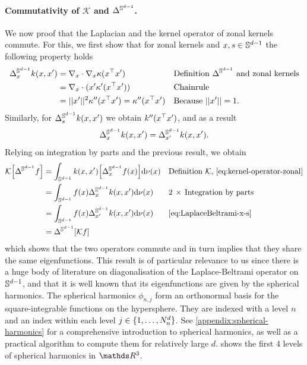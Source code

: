 \paragraph{Commutativity of $\mathcal{K}$ and $\Delta^{\mathbb{S}^{d-1}}$.}
We now proof that the Laplacian and the kernel operator of zonal kernels commute. For this, we first show that for zonal kernels and $x,s \in \mathbb{S}^{d-1}$ the following property holds
\begin{align}
    \Delta^{\mathbb{S}^{d-1}}_x k(x, x') 
     &= \nabla_x \cdot \nabla_x \kappa(x^{\top} x') && \text{Definition $\Delta^{\mathbb{S}^{d-1}}$ and zonal kernels}\\
     &= \nabla_x \cdot (x' \kappa'(x^{\top} x'))  && \text{Chainrule} \\
     &= \lvert\lvert x'\rvert\rvert^2 \kappa''(x^{\top} x') = \kappa''(x ^{\top} x') && \text{Because } \lvert\lvert x'\rvert\rvert = 1.
\end{align}
Similarly, for $\Delta^{\mathbb{S}^{d-1}}_s k(x, x')$ we obtain $k''(x ^{\top} x')$, and as a result
\begin{equation}
    \label{eq:LaplaceBeltrami-x-s}
\Delta^{\mathbb{S}^{d-1}}_x k(x, x') = \Delta^{\mathbb{S}^{d-1}}_{x'} k(x, x').
\end{equation}
Relying on integration by parts and the previous result, we obtain
\begin{align}
    \mathcal{K} \left[\LaplaceBeltrami f\right] &= \int_{\dsphere} k(x, x') \left[\LaplaceBeltrami_x f(x)\right] \calcd{\nu(x)} && \text{Definition $\mathcal{K}$, \cref{eq:kernel-operator-zonal}}\\
    &= \int_{\dsphere} f(x) \LaplaceBeltrami_x k(x, x')  \calcd{\nu(x)} && 2\,\times\,\text{Integration by parts}\\
    &= \int_{\dsphere} f(x) \LaplaceBeltrami_{x'} k(x, x')  \calcd{\nu(x)}  && \text{\cref{eq:LaplaceBeltrami-x-s}} \\
    &= \LaplaceBeltrami \left[ \mathcal{K} f \right]
\end{align}
which shows that the two operators commute and in turn implies that they share the same eigenfunctions. This result is of particular relevance to us since there is a huge body of literature on diagonalisation of the Laplace-Beltrami operator on $\mathbb{S}^{d-1}$, and that it is well known that its eigenfunctions are given by the spherical harmonics. The spherical harmonics $\phi_{n,j}$ form an orthonormal basis for the square-integrable functions on the hypersphere. They are indexed with a level $n$ and an index within each level $j \in \{1, \dots, N^d_n\}$. See \cref{appendix:spherical-harmonics} for a comprehensive introduction to spherical harmonics, as well as a practical algorithm to compute them for relatively large $d$.  shows the first 4 levels of spherical harmonics in $\Reals^3$.

